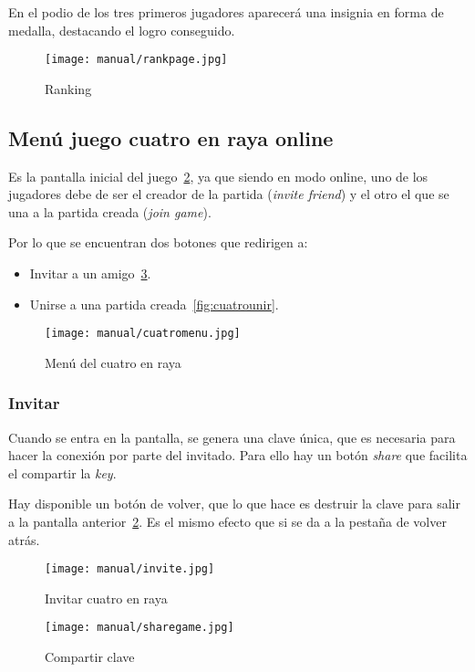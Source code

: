 En el podio de los tres primeros jugadores aparecerá una insignia en forma de medalla, destacando el logro conseguido.

\begin{figure}[H]
	\centering
	\texttt{[image: manual/rankpage.jpg]}
	\caption{Ranking}\label{fig:rankpage}
\end{figure}

\subsection{Menú juego cuatro en raya online}\label{cuatromenu}
Es la pantalla inicial del juego~\ref{fig:cuatromenu}, ya que siendo en modo online, uno de los jugadores debe de ser el creador de la  partida (\emph{invite friend}) y el otro el que se una a la partida creada (\emph{join game}).

Por lo que se encuentran dos botones que redirigen a:
\begin{itemize}
	\item Invitar a un amigo~\ref{fig:cuatroinvitar}.
	\item Unirse a una partida creada~\ref{fig:cuatrounir}.
\end{itemize}

\begin{figure}[H]
	\centering
	\texttt{[image: manual/cuatromenu.jpg]}
	\caption{Menú del cuatro en raya}\label{fig:cuatromenu}
\end{figure}

\subsubsection{Invitar}\label{cuatroinvitar}
Cuando se entra en la pantalla, se genera una clave única, que es necesaria para hacer la conexión por parte del invitado. Para ello hay un botón \emph{share} que facilita el compartir la \emph{key}.

Hay disponible un botón de volver, que lo que hace es destruir la clave para salir a la pantalla anterior~\ref{fig:cuatromenu}. Es el mismo efecto que si se da a la pestaña de volver atrás.


\begin{figure}[H]
	\centering
	\texttt{[image: manual/invite.jpg]}
	\caption{Invitar cuatro en raya}\label{fig:cuatroinvitar}
\end{figure}

\begin{figure}[H]
	\centering
	\texttt{[image: manual/sharegame.jpg]}
	\caption{Compartir clave}\label{fig:sharegame}
\end{figure}

